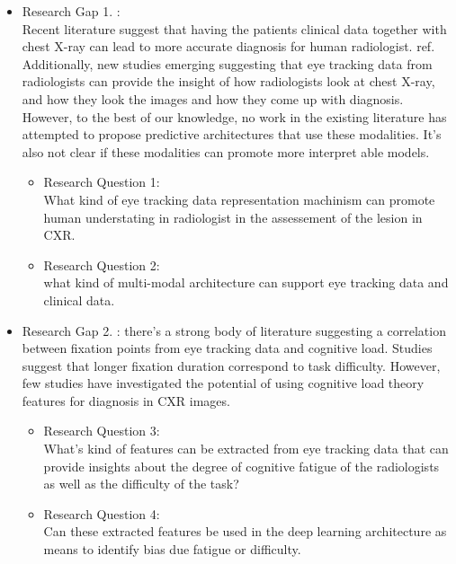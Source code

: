 \begin{itemize}
    \item Research Gap 1. : \\ Recent literature suggest that having the patients clinical data together with chest X-ray can lead to more accurate diagnosis for human radiologist. ref. Additionally, new studies emerging suggesting that eye tracking data from radiologists can provide the insight of how radiologists look at chest X-ray, and how they look the images and how they come up with diagnosis. However, to the best of our knowledge, no work in the existing literature has attempted to propose predictive architectures that use these modalities. It's also not clear if these modalities can promote more interpret able models.
          \begin{itemize}
              \item  Research Question 1: \\ What kind of eye tracking data representation machinism can promote human understating in radiologist in the assessement of the lesion in CXR.
              \item Research Question 2: \\ what kind of multi-modal architecture can support eye tracking data and clinical data.
          \end{itemize}
    \item  Research Gap 2. : there's a strong body of literature suggesting a correlation between fixation points from eye tracking data and cognitive load. Studies suggest that longer fixation duration correspond to task difficulty. However, few studies have investigated the potential of using cognitive load theory features for diagnosis in CXR images.
          \begin{itemize}
              \item Research Question 3: \\ What's kind of features can be extracted from eye tracking data that can provide insights about the degree of cognitive fatigue of the radiologists as well as the difficulty of the task?
              \item Research Question 4: \\ Can these extracted features be used in the deep learning architecture as means to identify bias due fatigue or difficulty.
          \end{itemize}


\end{itemize}

